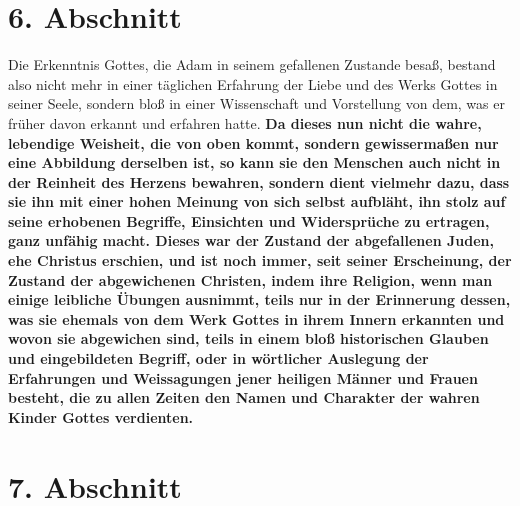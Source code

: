 \section{6. Abschnitt} \label{kap7_ab6}

\label{ref:07_06_wissenschaft}
Die Erkenntnis Gottes, die Adam in seinem gefallenen Zustande besaß, bestand
also nicht mehr in einer täglichen Erfahrung der Liebe und des Werks Gottes in
seiner Seele, sondern bloß in einer Wissenschaft
und Vorstellung von dem, was er
früher davon erkannt und erfahren hatte. \textbf{Da dieses nun nicht die wahre,
lebendige Weisheit, die von oben
kommt, sondern gewissermaßen nur eine Abbildung
derselben ist, so kann sie den Menschen auch nicht in der Reinheit des Herzens
bewahren, sondern dient vielmehr dazu, dass sie ihn mit einer hohen Meinung von
sich selbst aufbläht, ihn stolz auf seine erhobenen Begriffe,
Einsichten und Widersprüche zu ertragen, ganz
unfähig macht. Dieses war der Zustand der
abgefallenen Juden, ehe Christus erschien,
und ist noch immer, seit seiner
Erscheinung, der Zustand der abgewichenen
Christen, indem ihre Religion, wenn
man einige leibliche Übungen ausnimmt, teils nur in der Erinnerung dessen, was
sie ehemals von dem Werk Gottes in ihrem Innern erkannten und wovon sie
abgewichen sind, teils in einem bloß historischen Glauben und eingebildeten
Begriff, oder in wörtlicher Auslegung
 der Erfahrungen und Weissagungen jener
heiligen Männer und Frauen besteht, die zu allen Zeiten den Namen und Charakter
der wahren Kinder Gottes verdienten.}

\section{7. Abschnitt} \label{kap7_ab7}

